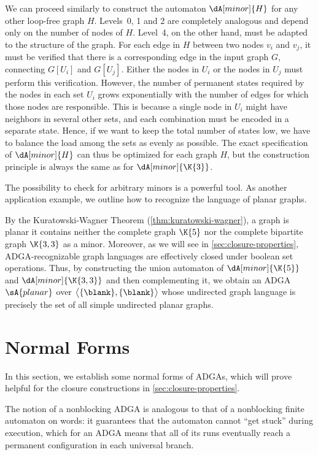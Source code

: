 \documentclass[a4paper,11pt,twoside]{report} \pdfoutput=1
\begin{document}
We can proceed similarly to construct the automaton $\dA[minor]{H}$
for any other loop-free graph $H$. Levels~0, 1 and 2 are completely
analogous and depend only on the number of nodes of $H$. Level~4, on
the other hand, must be adapted to the structure of the graph. For
each edge in $H$ between two nodes $v_i$ and $v_j$, it must be
verified that there is a corresponding edge in the input graph $G$,
connecting $G[U_i]$ and $G[U_j]$. Either the nodes in $U_i$ or the
nodes in $U_j$ must perform this verification. However, the number of
permanent states required by the nodes in each set $U_i$ grows
exponentially with the number of edges for which those nodes are
responsible. This is because a single node in $U_i$ might have
neighbors in several other sets, and each combination must be encoded
in a separate state. Hence, if we want to keep the total number of
states low, we have to balance the load among the sets as evenly as
possible. The exact specification of $\dA[minor]{H}$ can thus be
optimized for each graph $H$, but the construction principle is always
the same as for $\dA[minor]{\K{3}}$.

The possibility to check for arbitrary minors is a powerful tool. As
another application example, we outline how to recognize the language
of planar graphs.

\begin{example}
  By the Kuratowski-Wagner Theorem (\cref{thm:kuratowski-wagner}), a
  graph is planar \Iff it contains neither the complete graph $\K{5}$
  nor the complete bipartite graph $\K{3,3}$ as a minor. Moreover, as
  we will see in \cref{sec:closure-properties}, ADGA-recognizable
  graph languages are effectively closed under boolean set
  operations. Thus, by constructing the union automaton of
  $\dA[minor]{\K{5}}$ and $\dA[minor]{\K{3,3}}$ and then complementing
  it, we obtain an ADGA $\sA{planar}$ over
  $\bigl\langle\{\blank\},\{\blank\}\bigr\rangle$ whose undirected
  graph language is precisely the set of all simple undirected planar
  graphs.
\end{example}

\section{Normal Forms} \label{sec:normal-forms}
In this section, we establish some normal forms of ADGAs, which will
prove helpful for the closure constructions in
\cref{sec:closure-properties}.

The notion of a nonblocking ADGA is analogous to that of a nonblocking
finite automaton on words: it guarantees that the automaton cannot
“get stuck” during execution, which for an ADGA means that all of its
runs eventually reach a permanent configuration in each universal
branch.
\end{document}
